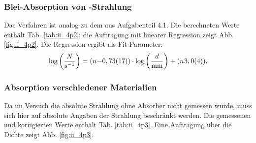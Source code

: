 

\subsubsection{Blei-Absorption von \texorpdfstring{}{Cs137}-Strahlung}
Das Verfahren ist analog zu dem aus Aufgabenteil 4.1. Die berechneten Werte enthält Tab. \ref{tab:ii_4p2}; die Auftragung mit linearer Regression zeigt Abb. \ref{fig:ii_4p2}. Die Regression ergibt als Fit-Parameter:
\begin{equation}
\log\left(\frac{N}{\si{\per\second}}\right) = (\numb{-0,73(17)}) \cdot \log\left(\frac{d}{\si{mm}}\right) + (\numb{3,0(4)}).
\end{equation}



\subsubsection{Absorption verschiedener Materialien}
Da im Versuch die absolute Strahlung ohne Absorber nicht gemessen wurde, muss sich hier auf absolute Angaben der Strahlung beschränkt werden. Die gemessenen und korrigierten Werte enthält Tab. \ref{tab:ii_4p3}. Eine Auftragung über die Dichte zeigt Abb. \ref{fig:ii_4p3}.


